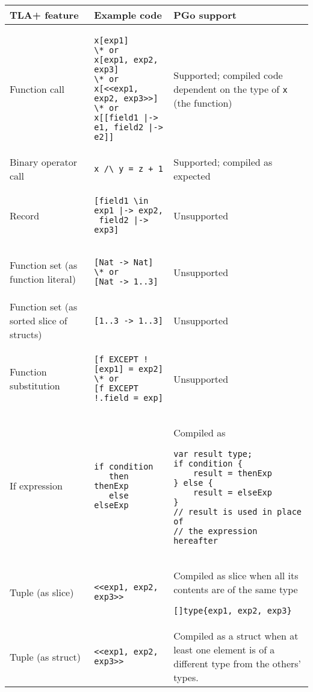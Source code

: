 \begin{center}
\lstset{style=tabularstyle}
\renewcommand{\arraystretch}{1.5}
\begin{longtable}{ || m{} | m{} | m{} || }
	\hline
	\textbf{TLA+ feature} & \textbf{Example code} & \textbf{PGo support} \\
	\hline\hline
	Function call &
	\begin{lstlisting}[language=pcal]
x[exp1]
\* or
x[exp1, exp2, exp3]
\* or
x[<<exp1, exp2, exp3>>]
\* or
x[[field1 |-> e1, field2 |-> e2]]
	\end{lstlisting} &
	Supported; compiled code dependent on the type of \lstinline[language=pcal]|x| (the function) \\
	\hline
	Binary operator call & \lstinline[language=pcal]|x /\ y = z + 1| & Supported; compiled as expected \\
	\hline
	Record &
	\begin{lstlisting}[language=pcal]
[field1 \in exp1 |-> exp2,
 field2 |-> exp3]
	\end{lstlisting} &
	Unsupported \\
	\hline
	Function set (as function literal) &
	\begin{lstlisting}[language=pcal]
[Nat -> Nat]
\* or
[Nat -> 1..3]
	\end{lstlisting} &
	Unsupported \\
	\hline
	Function set (as sorted slice of structs) & \lstinline[language=pcal]|[1..3 -> 1..3]| & Unsupported \\
	\hline
	Function substitution &
	\begin{lstlisting}[language=pcal]
[f EXCEPT ![exp1] = exp2]
\* or
[f EXCEPT !.field = exp]
	\end{lstlisting} &
	Unsupported \\
	\hline
	If expression &
	\begin{lstlisting}[language=pcal]
if condition
   then thenExp
   else elseExp
	\end{lstlisting} &
	Compiled as
	\begin{lstlisting}[language=golang]
var result type;
if condition {
	result = thenExp
} else {
	result = elseExp
}
// result is used in place of
// the expression hereafter
	\end{lstlisting} \\
	\hline
	Tuple (as slice) & \lstinline[language=pcal]|<<exp1, exp2, exp3>>| & Compiled as slice when all its contents are of the same type
	\begin{lstlisting}[language=golang]
[]type{exp1, exp2, exp3}
	\end{lstlisting} \\
	\hline
	Tuple (as struct) & \lstinline[language=pcal]|<<exp1, exp2, exp3>>| & Compiled as a struct when at least one element is of a different type from the others' types.


\end{longtable}
\end{center}

